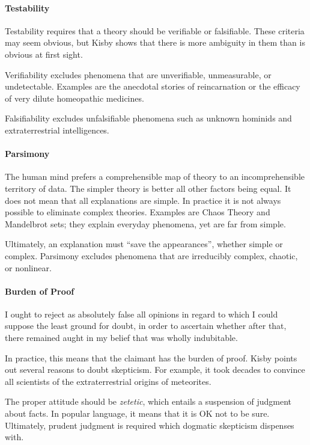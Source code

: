 \paragraph{Testability}
Testability requires that a theory should be verifiable or falsifiable. These criteria may seem obvious, but Kisby shows
that there is more ambiguity in them than is obvious at first sight.

Verifiability excludes phenomena that are unverifiable, unmeasurable, or undetectable. Examples are the anecdotal
stories of reincarnation or the efficacy of very dilute homeopathic medicines.

Falsifiability excludes unfalsifiable phenomena such as unknown hominids and extraterrestrial intelligences.

\paragraph{Parsimony}
The human mind prefers a comprehensible map of theory to an incomprehensible territory of data. The simpler theory is
better all other factors being equal. It does not mean that all explanations are simple. In practice it is not always
possible to eliminate complex theories. Examples are Chaos Theory and Mandelbrot sets; they explain everyday phenomena,
yet are far from simple.

Ultimately, an explanation must “save the appearances”, whether simple or complex. Parsimony excludes phenomena that are
irreducibly complex, chaotic, or nonlinear.

\paragraph{Burden of Proof}
\begin{quotex}
I ought to reject as absolutely false all opinions in regard to which I could suppose the least ground for doubt, in
order to ascertain whether after that, there remained aught in my belief that was wholly indubitable. 

\end{quotex}
In practice, this means that the claimant has the burden of proof. Kisby points out several reasons to doubt skepticism.
For example, it took decades to convince all scientists of the extraterrestrial origins of meteorites.

The proper attitude should be \emph{zetetic}, which entails a suspension of judgment about facts. In popular language,
it means that it is OK not to be sure. Ultimately, prudent judgment is required which dogmatic skepticism dispenses
with.


